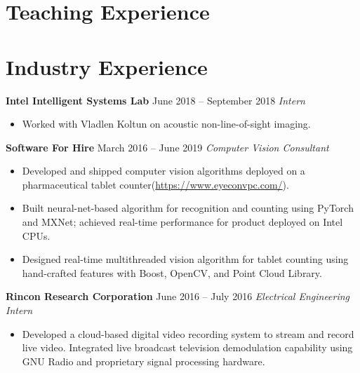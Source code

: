 \documentclass[10pt,letter,sans]{moderncv}
\begin{document}
\vspace{3mm}
\section{Teaching Experience}
  \vspace{-5mm}


\vspace{3mm}
\section{Industry Experience}
      {\bf Intel Intelligent Systems Lab} \hfill June 2018 -- September 2018 \newline
      {\it Intern}
        \iftrue
        \begin{itemize}
\item Worked with Vladlen Koltun on acoustic non-line-of-sight imaging.\end{itemize}
        \fi
	\vspace{2mm}
      {\bf Software For Hire} \hfill March 2016 -- June 2019 \newline
      {\it Computer Vision Consultant}
        \iftrue
        \begin{itemize}
\item Developed and shipped computer vision algorithms deployed on a pharmaceutical tablet counter{\newline}({\url{https://www.eyeconvpc.com/}}).\item Built neural-net-based algorithm for recognition and counting using PyTorch and MXNet; achieved real-time performance for product deployed on Intel CPUs.\item Designed real-time multithreaded vision algorithm for tablet counting using hand-crafted features with Boost, OpenCV, and Point Cloud Library.\end{itemize}
        \fi
	\vspace{2mm}
      {\bf Rincon Research Corporation} \hfill June 2016 -- July 2016 \newline
      {\it Electrical Engineering Intern}
        \iftrue
        \begin{itemize}
\item Developed a cloud-based digital video recording system to stream and record live video. Integrated live broadcast television demodulation capability using GNU Radio and proprietary signal processing hardware.\end{itemize}
        \fi
	\vspace{2mm}
  \vspace{-5mm}
\end{document}
